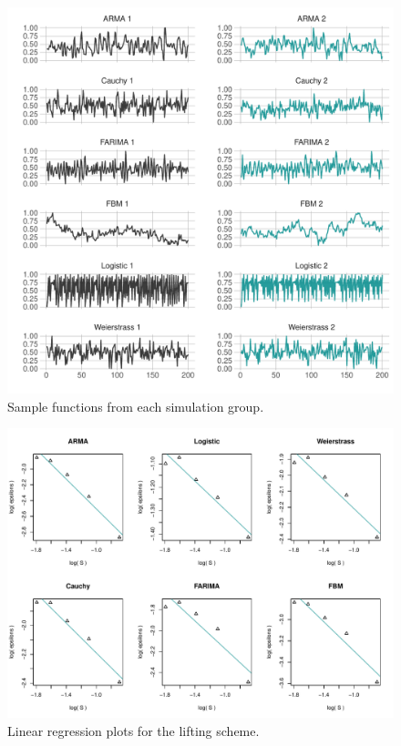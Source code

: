 \begin{figure}[!htbp]
  \begin{center}
  \includegraphics[width = \textwidth, keepaspectratio]{./figs/sim_jitter_plot_jitter_timeseries.pdf}
  \end{center} 
  \caption{Sample functions from each simulation group.  }
   \label{fig:jitter-ts}
\end{figure}

\begin{figure}[!htbp]
  \begin{center}
  \includegraphics[width = \textwidth, keepaspectratio]{./figs/sim_jitter_plot-sim-fits.pdf}
  \end{center} 
  \caption{Linear regression plots for the lifting scheme.}
  \label{fig:lift-lm}
\end{figure}


